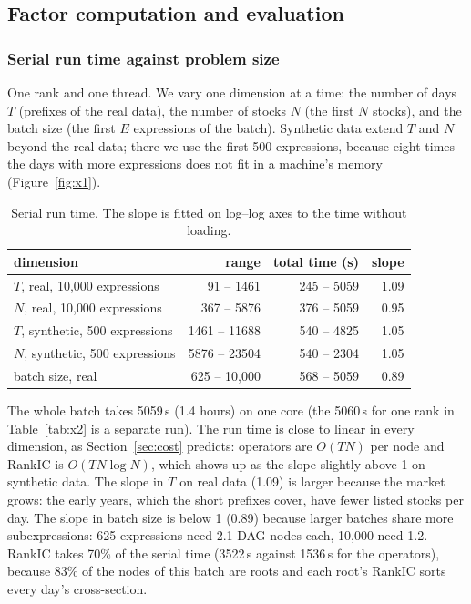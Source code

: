 \documentclass[11pt,a4paper]{article}
\begin{document}
\subsection{Factor computation and evaluation}
\label{sec:fc-exp}

\subsubsection{Serial run time against problem size}
\label{sec:x1}
One rank and one thread. We vary one dimension at a time: the number of days $T$ (prefixes of the real data), the number of stocks $N$ (the first $N$ stocks), and the batch size (the first $E$ expressions of the batch). Synthetic data extend $T$ and $N$ beyond the real data; there we use the first 500 expressions, because eight times the days with more expressions does not fit in a machine's memory (Figure~\ref{fig:x1}).

\begin{table}[H]
\centering
\begin{tabular}{lrrr}
\toprule
dimension & range & total time (s) & slope \\
\midrule
$T$, real, 10{,}000 expressions & 91 -- 1461 & 245 -- 5059 & 1.09 \\
$N$, real, 10{,}000 expressions & 367 -- 5876 & 376 -- 5059 & 0.95 \\
$T$, synthetic, 500 expressions & 1461 -- 11688 & 540 -- 4825 & 1.05 \\
$N$, synthetic, 500 expressions & 5876 -- 23504 & 540 -- 2304 & 1.05 \\
batch size, real & 625 -- 10{,}000 & 568 -- 5059 & 0.89 \\
\bottomrule
\end{tabular}
\caption{Serial run time. The slope is fitted on log--log axes to the time without loading.}
\label{tab:x1}
\end{table}

The whole batch takes 5059\,s (1.4 hours) on one core (the 5060\,s for one rank in Table~\ref{tab:x2} is a separate run). The run time is close to linear in every dimension, as Section~\ref{sec:cost} predicts: operators are $O(TN)$ per node and RankIC is $O(TN\log N)$, which shows up as the slope slightly above 1 on synthetic data. The slope in $T$ on real data (1.09) is larger because the market grows: the early years, which the short prefixes cover, have fewer listed stocks per day. The slope in batch size is below 1 (0.89) because larger batches share more subexpressions: 625 expressions need 2.1 DAG nodes each, 10{,}000 need 1.2. RankIC takes 70\% of the serial time (3522\,s against 1536\,s for the operators), because 83\% of the nodes of this batch are roots and each root's RankIC sorts every day's cross-section.
\end{document}
